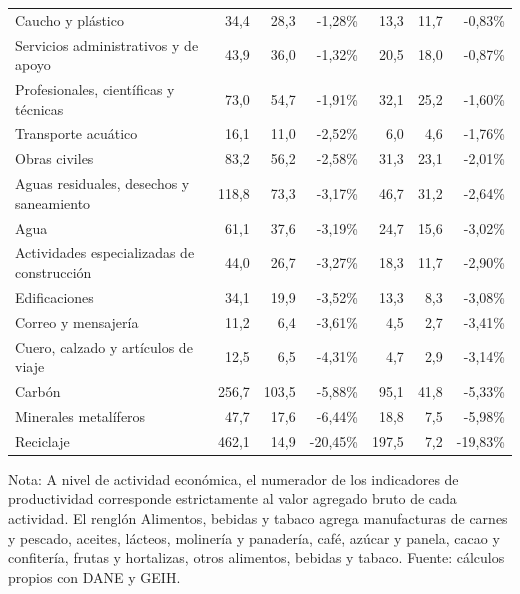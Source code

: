 \begin{longtable}{p{}rrrrrr}
Caucho y plástico & 34,4 & 28,3 & -1,28\% & 13,3 & 11,7 & -0,83\% \\
Servicios administrativos y de apoyo & 43,9 & 36,0 & -1,32\% & 20,5 & 18,0 & -0,87\% \\
Profesionales, científicas y técnicas & 73,0 & 54,7 & -1,91\% & 32,1 & 25,2 & -1,60\% \\
Transporte acuático & 16,1 & 11,0 & -2,52\% & 6,0 & 4,6 & -1,76\% \\
Obras civiles & 83,2 & 56,2 & -2,58\% & 31,3 & 23,1 & -2,01\% \\
Aguas residuales, desechos y saneamiento & 118,8 & 73,3 & -3,17\% & 46,7 & 31,2 & -2,64\% \\
Agua & 61,1 & 37,6 & -3,19\% & 24,7 & 15,6 & -3,02\% \\
Actividades especializadas de construcción & 44,0 & 26,7 & -3,27\% & 18,3 & 11,7 & -2,90\% \\
Edificaciones & 34,1 & 19,9 & -3,52\% & 13,3 & 8,3 & -3,08\% \\
Correo y mensajería & 11,2 & 6,4 & -3,61\% & 4,5 & 2,7 & -3,41\% \\
Cuero, calzado y artículos de viaje & 12,5 & 6,5 & -4,31\% & 4,7 & 2,9 & -3,14\% \\
Carbón & 256,7 & 103,5 & -5,88\% & 95,1 & 41,8 & -5,33\% \\
Minerales metalíferos & 47,7 & 17,6 & -6,44\% & 18,8 & 7,5 & -5,98\% \\
Reciclaje & 462,1 & 14,9 & -20,45\% & 197,5 & 7,2 & -19,83\% \\
\bottomrule
\end{longtable}
\endgroup
{\footnotesize Nota:  A nivel de actividad económica, el numerador de los indicadores de productividad corresponde estrictamente al valor agregado bruto de cada actividad. El renglón Alimentos, bebidas y tabaco agrega manufacturas de carnes y pescado, aceites, lácteos, molinería y panadería, café, azúcar y panela, cacao y confitería, frutas y hortalizas, otros alimentos, bebidas y tabaco. Fuente: cálculos propios con DANE y GEIH.}
